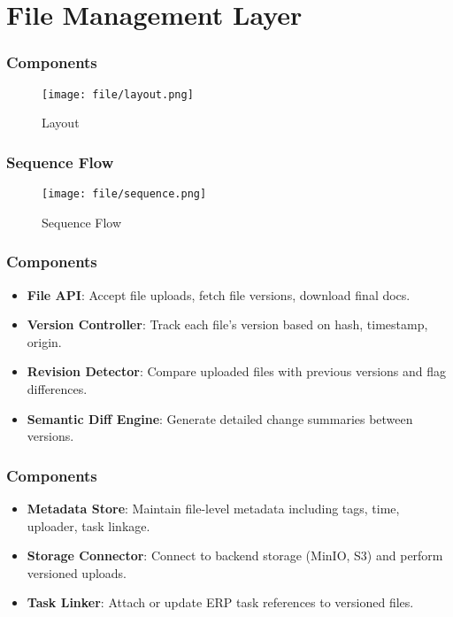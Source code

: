 \section{File Management Layer}

\begin{frame}
    \frametitle{ Components}
    \begin{figure}
        \centering
        \texttt{[image: file/layout.png]} %
        \caption{Layout}
    \end{figure}
\end{frame}

\begin{frame}
    \frametitle{Sequence Flow}
    \begin{figure}
        \centering
        \texttt{[image: file/sequence.png]} %
        \caption{Sequence Flow}
    \end{figure}
\end{frame}


\begin{frame}
    \frametitle{Components}
    \begin{itemize}
        \item \textbf{File API}: Accept file uploads, fetch file versions, download final docs.
        \item \textbf{Version Controller}: Track each file's version based on hash, timestamp, origin.
        \item \textbf{Revision Detector}: Compare uploaded files with previous versions and flag differences.
        \item \textbf{Semantic Diff Engine}: Generate detailed change summaries between versions.
    \end{itemize}
\end{frame}

\begin{frame}
    \frametitle{Components}
    \begin{itemize}
        \item \textbf{Metadata Store}: Maintain file-level metadata including tags, time, uploader, task linkage.
        \item \textbf{Storage Connector}: Connect to backend storage (MinIO, S3) and perform versioned uploads.
        \item \textbf{Task Linker}: Attach or update ERP task references to versioned files.
    \end{itemize}
\end{frame}

